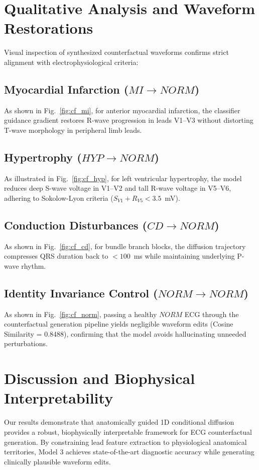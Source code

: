 \documentclass[12pt]{elsarticle}
\begin{document}
\section{Qualitative Analysis and Waveform Restorations}
\label{sec:qualitative}

Visual inspection of synthesized counterfactual waveforms confirms strict alignment with electrophysiological criteria:

\subsection{Myocardial Infarction ($MI \to NORM$)}
As shown in Fig.~\ref{fig:cf_mi}, for anterior myocardial infarction, the classifier guidance gradient restores R-wave progression in leads V1--V3 without distorting T-wave morphology in peripheral limb leads.

\subsection{Hypertrophy ($HYP \to NORM$)}
As illustrated in Fig.~\ref{fig:cf_hyp}, for left ventricular hypertrophy, the model reduces deep S-wave voltage in V1--V2 and tall R-wave voltage in V5--V6, adhering to Sokolow-Lyon criteria ($S_{V1} + R_{V5} < 3.5$~mV).

\subsection{Conduction Disturbances ($CD \to NORM$)}
As shown in Fig.~\ref{fig:cf_cd}, for bundle branch blocks, the diffusion trajectory compresses QRS duration back to $< 100$~ms while maintaining underlying P-wave rhythm.

\subsection{Identity Invariance Control ($NORM \to NORM$)}
As shown in Fig.~\ref{fig:cf_norm}, passing a healthy $NORM$ ECG through the counterfactual generation pipeline yields negligible waveform edits (Cosine Similarity = 0.8488), confirming that the model avoids hallucinating unneeded perturbations.

\section{Discussion and Biophysical Interpretability}
\label{sec:discussion}

Our results demonstrate that anatomically guided 1D conditional diffusion provides a robust, biophysically interpretable framework for ECG counterfactual generation. By constraining lead feature extraction to physiological anatomical territories, Model 3 achieves state-of-the-art diagnostic accuracy while generating clinically plausible waveform edits.
\end{document}
